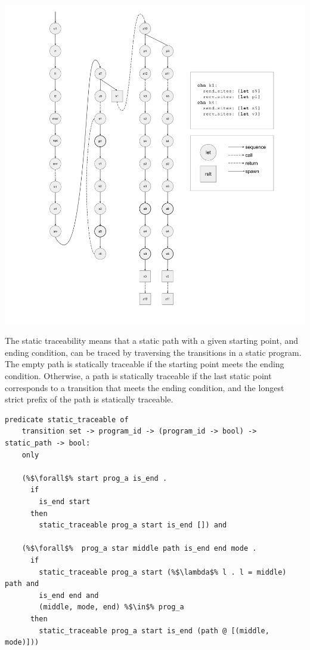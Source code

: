 \documentclass{article}
\begin{document}
\includegraphics[width=1.3\textwidth, left]{cml_graph.pdf}

The static traceability means that a static path with a given starting point, and ending
condition, can be traced by traversing the transitions in a static program.
The empty path is statically traceable if the starting point meets the ending condition.
Otherwise, a path is statically traceable if the last static point corresponds to a transition
that meets the ending condition, and the longest strict prefix of the path is statically
traceable.  

\begin{lstlisting}[language=logic, escapechar=\%]
  predicate static_traceable of
    transition set -> program_id -> (program_id -> bool) -> static_path -> bool:
    only

    (%$\forall$% start prog_a is_end .
      if
        is_end start
      then
        static_traceable prog_a start is_end []) and

    (%$\forall$%  prog_a star middle path is_end end mode .
      if 
        static_traceable prog_a start (%$\lambda$% l . l = middle) path and
        is_end end and
        (middle, mode, end) %$\in$% prog_a 
      then
        static_traceable prog_a start is_end (path @ [(middle, mode)]))
  \end{lstlisting}
\end{document}
